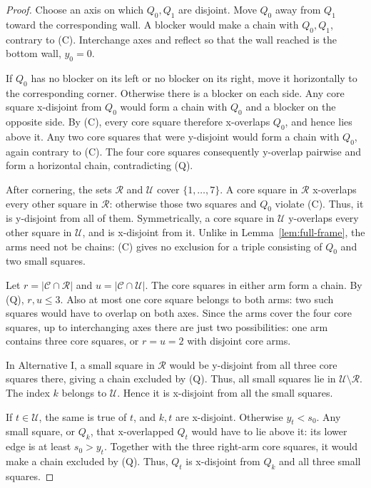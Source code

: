 \documentclass[12pt]{amsart}
\theoremstyle{definition}
\theoremstyle{remark}
\numberwithin{equation}{section}
\numberwithin{figure}{section}
\numberwithin{table}{section}
\begin{document}
\begin{proof}
Choose an axis on which \(Q_0,Q_1\) are disjoint. Move \(Q_0\) away from \(Q_1\)
toward the corresponding wall. A blocker would make a chain with \(Q_0,Q_1\),
contrary to (C). Interchange axes and reflect so that the wall reached is the
bottom wall, \(y_0=0\).

If \(Q_0\) has no blocker on its left or no blocker on its right, move it
horizontally to the corresponding corner. Otherwise there is a blocker on
each side. Any core square x-disjoint
from \(Q_0\) would form a chain with \(Q_0\) and a blocker on the opposite side.
By (C), every core square therefore x-overlaps \(Q_0\), and hence
lies above it. Any two core squares that were y-disjoint would form a chain
with \(Q_0\), again contrary to (C). The four core squares consequently
y-overlap pairwise and form a horizontal chain, contradicting (Q).

After cornering, the sets \(\mathcal R\) and \(\mathcal U\) cover
\(\{1,\ldots,7\}\). A core square in \(\mathcal R\) x-overlaps every other square in \(\mathcal R\): otherwise those two squares
and \(Q_0\) violate (C). Thus, it is y-disjoint from all of them. Symmetrically,
a core square in \(\mathcal U\) y-overlaps every other square in
\(\mathcal U\), and is x-disjoint from it. Unlike in
Lemma~\ref{lem:full-frame}, the arms need not be chains: (C) gives no
exclusion for a triple consisting of \(Q_0\) and two small squares.

Let
\(r=|\mathcal C\cap\mathcal R|\) and
\(u=|\mathcal C\cap\mathcal U|\).
The core squares in either arm form a chain. By (Q), \(r,u\le3\).
Also at most one core square belongs to both arms: two such squares would
have to overlap on both axes. Since the arms cover the four core squares,
up to interchanging axes there are just two possibilities: one arm contains
three core squares, or $r=u=2$ with disjoint core arms.

In Alternative I, a small square in \(\mathcal R\) would be y-disjoint from
all three core squares there, giving a chain excluded by (Q). Thus, all
small squares lie in \(\mathcal U\setminus\mathcal R\). The index \(k\) belongs
to \(\mathcal U\). Hence it is x-disjoint from all the small squares.

If \(t\in\mathcal U\), the same is true of \(t\), and \(k,t\) are
x-disjoint. Otherwise \(y_t<s_0\). Any small square, or \(Q_k\), that
x-overlapped \(Q_t\) would have to lie above it: its lower edge
is at least \(s_0>y_t\). Together with the three right-arm core squares,
it would make a chain excluded by (Q). Thus, \(Q_t\) is x-disjoint from
\(Q_k\) and all three small squares.


\end{proof}
\end{document}
